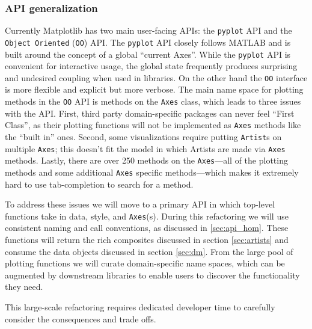 \documentclass[11pt]{article}  %
\begin{document}
\subsubsection{API generalization}
\label{sec:api_gen}
Currently Matplotlib has two main user-facing APIs: the
\texttt{pyplot} API and the \texttt{Object Oriented} (\texttt{OO})
API.  The \texttt{pyplot} API closely follows MATLAB and is built
around the concept of a global ``current Axes''.
While the
\texttt{pyplot} API is convenient for interactive usage, the global
state frequently produces surprising and undesired coupling when used
in libraries.
On the other hand the \texttt{OO} interface is more flexible and
explicit but more verbose.
The main name space for plotting methods in the \texttt{OO} API is
methods on the \texttt{Axes} class, which leads to three issues with
the API.
First, third party domain-specific packages can never feel ``First
Class'', as their plotting functions will not be implemented as
\texttt{Axes} methods like the ``built in'' ones.
Second, some visualizations require putting \texttt{Artist}s on
multiple \texttt{Axes}; this doesn't fit the model in which Artists
are made via \texttt{Axes} methods.
Lastly, there are over 250 methods on the \texttt{Axes}---all of the
plotting methods and some additional \texttt{Axes} specific
methods---which makes it extremely hard to use tab-completion to
search for a method.

To address these issues we will move to a primary API in which
top-level functions take in data, style, and \texttt{Axes}(s).  During
this refactoring we will use consistent naming and call conventions,
as discussed in \ref{sec:api_hom}.
These functions will return the rich composites discussed in section
\ref{sec:artists} and consume the data objects discussed in section
\ref{sec:dm}.  From the large pool of plotting functions we will
curate domain-specific name spaces, which can be augmented by
downstream libraries to enable users to discover the functionality
they need.

This large-scale refactoring requires dedicated developer
time to carefully consider the consequences and trade offs.

\end{document}
